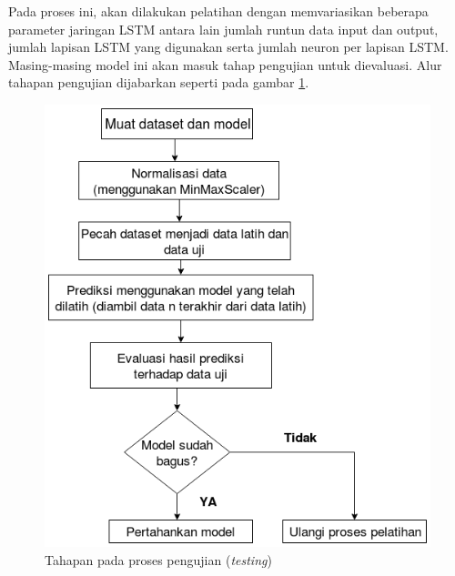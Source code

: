 \documentclass[conference]{IEEEtran}
\begin{document}
Pada proses ini, akan dilakukan pelatihan dengan memvariasikan beberapa parameter jaringan LSTM antara lain jumlah runtun data input dan output, jumlah lapisan LSTM yang digunakan serta jumlah neuron per lapisan LSTM. 
Masing-masing model ini akan masuk tahap pengujian untuk dievaluasi. Alur tahapan pengujian dijabarkan seperti pada gambar \ref{lstm_testing}.
\begin{figure}[t]
	\centering
	\includegraphics[scale=0.5]{Testing_lstm}
	\caption{Tahapan pada proses pengujian (\textit{testing})}
	\label{lstm_testing}
\end{figure}
\end{document}
